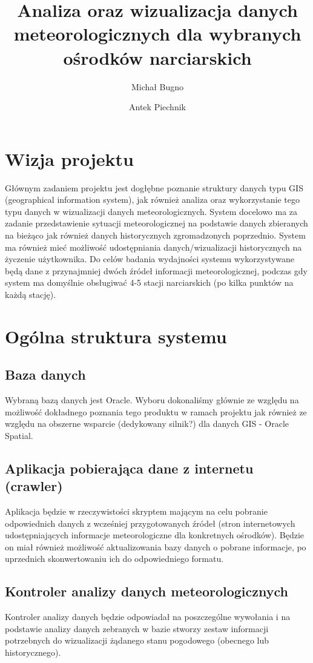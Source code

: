 \documentclass[12pt]{article}
\author{Michał Bugno \and Antek Piechnik}
\title{Analiza oraz wizualizacja danych meteorologicznych dla wybranych ośrodków narciarskich}
\begin{document}
\maketitle
\tableofcontents
\newpage

\section{Wizja projektu}
Głównym zadaniem projektu jest dogłębne poznanie struktury
danych typu GIS (geographical information system), jak również analiza oraz
wykorzystanie tego typu danych w wizualizacji danych meteorologicznych. System
docelowo ma za zadanie przedstawienie sytuacji meteorologicznej na podstawie
danych zbieranych na bieżąco jak również danych historycznych zgromadzonych
poprzednio. System ma również mieć możliwość udostępniania danych/wizualizacji
historycznych na życzenie użytkownika. Do celów badania wydajności systemu
wykorzystywane będą dane z przynajmniej dwóch źródeł informacji
meteorologicznej, podczas gdy system ma domyślnie obsługiwać 4-5 stacji
narciarskich (po kilka punktów na każdą stację).

\section{Ogólna struktura systemu}

\subsection{Baza danych}
Wybraną bazą danych jest Oracle. Wyboru dokonaliśmy głównie ze względu na
możliwość dokładnego poznania tego produktu w ramach projektu jak również ze
względu na obszerne wsparcie (dedykowany silnik?) dla danych GIS - Oracle
Spatial.

\subsection{Aplikacja pobierająca dane z internetu (crawler)}
Aplikacja będzie w rzeczywistości skryptem mającym na celu pobranie
odpowiednich danych z wcześniej przygotowanych źródeł (stron internetowych
    udostępniających informacje meteorologiczne dla konkretnych ośrodków).
Będzie on miał również możliwość aktualizowania bazy danych o pobrane
informacje, po uprzednich skonwertowaniu ich do odpowiedniego formatu.

\subsection{Kontroler analizy danych meteorologicznych}
Kontroler analizy danych będzie odpowiadał na poszczególne wywołania i na
podstawie analizy danych zebranych w bazie stworzy zestaw informacji
potrzebnych do wizualizacji żądanego stanu pogodowego (obecnego lub
    historycznego).
\end{document}
